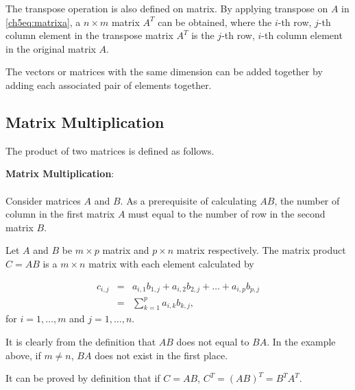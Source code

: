 The transpose operation is also defined on matrix. By applying transpose on $A$ in \eqref{ch5eq:matrixa}, a $n\times m$ matrix $A^T$ can be obtained, where the $i$-th row, $j$-th column element in the transpose matrix $A^T$ is the $j$-th row, $i$-th column element in the original matrix $A$.

The vectors or matrices with the same dimension can be added together by adding each associated pair of elements together.

\subsection{Matrix Multiplication}

The product of two matrices is defined as follows. 

\begin{mdframed}
\textbf{Matrix Multiplication}:
\\
\\
Consider matrices $A$ and $B$. As a prerequisite of calculating $AB$, the number of column in the first matrix $A$ must equal to the number of row in the second matrix $B$. 

Let $A$ and $B$ be $m\times p$ matrix and $p\times n$ matrix respectively. The matrix product $C=AB$ is a $m \times n$ matrix with each element calculated by

\begin{eqnarray}
    c_{i,j} &=& a_{i,1}b_{1,j} + a_{i,2}b_{2,j} + \ldots + a_{i,p}b_{p,j} \nonumber \\
    &=& \sum_{k=1}^p a_{i,k}b_{k,j}, \nonumber
\end{eqnarray}
for $i = 1, \ldots, m$ and $j= 1, \ldots, n$.

It is clearly from the definition that $AB$ does not equal to $BA$. In the example above, if $m\neq n$, $BA$ does not exist in the first place.
\end{mdframed}

It can be proved by definition that if $C=AB$, $C^T = (AB)^T = B^TA^T$.

